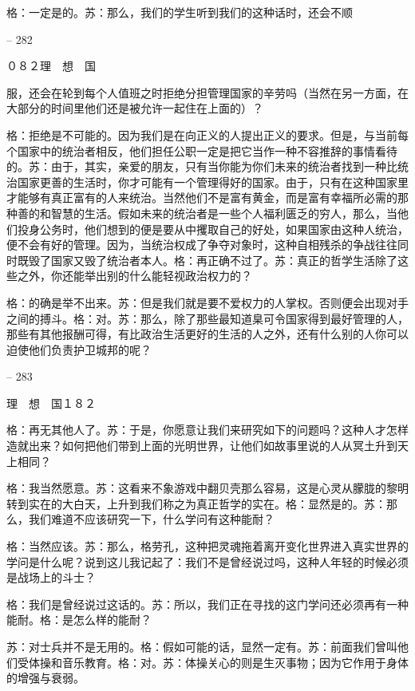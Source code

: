\documentclass[11pt,oneside]{book}
\begin{document}
\begin{common-format}
    格：一定是的。苏：那么，我们的学生听到我们的这种话时，还会不顺

    

-- 282

    ０８２理　想　国

    服，还会在轮到每个人值班之时拒绝分担管理国家的辛劳吗（当然在另一方面，在大部分的时间里他们还是被允许一起住在上面的）？

    格：拒绝是不可能的。因为我们是在向正义的人提出正义的要求。但是，与当前每个国家中的统治者相反，他们担任公职一定是把它当作一种不容推辞的事情看待的。苏：由于，其实，亲爱的朋友，只有当你能为你们未来的统治者找到一种比统治国家更善的生活时，你才可能有一个管理得好的国家。由于，只有在这种国家里才能够有真正富有的人来统治。当然他们不是富有黄金，而是富有幸福所必需的那种善的和智慧的生活。假如未来的统治者是一些个人福利匮乏的穷人，那么，当他们投身公务时，他们想到的便是要从中攫取自己的好处，如果国家由这种人统治，便不会有好的管理。因为，当统治权成了争夺对象时，这种自相残杀的争战往往同时既毁了国家又毁了统治者本人。格：再正确不过了。苏：真正的哲学生活除了这些之外，你还能举出别的什么能轻视政治权力的？

    格：的确是举不出来。苏：但是我们就是要不爱权力的人掌权。否则便会出现对手之间的搏斗。格：对。苏：那么，除了那些最知道臬可令国家得到最好管理的人，那些有其他报酬可得，有比政治生活更好的生活的人之外，还有什么别的人你可以迫使他们负责护卫城邦的呢？

    

-- 283

    理　想　国１８２

    格：再无其他人了。苏：于是，你愿意让我们来研究如下的问题吗？这种人才怎样造就出来？如何把他们带到上面的光明世界，让他们如故事里说的人从冥土升到天上相同？

    格：我当然愿意。苏：这看来不象游戏中翻贝壳那么容易，这是心灵从朦胧的黎明转到实在的大白天，上升到我们称之为真正哲学的实在。格：显然是的。苏：那么，我们难道不应该研究一下，什么学问有这种能耐？

    格：当然应该。苏：那么，格劳孔，这种把灵魂拖着离开变化世界进入真实世界的学问是什么呢？说到这儿我记起了：我们不是曾经说过吗，这种人年轻的时候必须是战场上的斗士？

    格：我们是曾经说过这话的。苏：所以，我们正在寻找的这门学问还必须再有一种能耐。格：是怎么样的能耐？

    苏：对士兵并不是无用的。格：假如可能的话，显然一定有。苏：前面我们曾叫他们受体操和音乐教育。格：对。苏：体操关心的则是生灭事物；因为它作用于身体的增强与衰弱。

    


\end{common-format}
\end{document}
